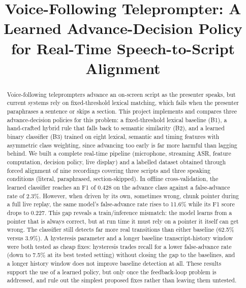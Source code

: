 \documentclass[conference,a4paper]{IEEEtran}
\begin{document}
\title{Voice-Following Teleprompter: A Learned Advance-Decision Policy for Real-Time Speech-to-Script Alignment}

\author{
}

\maketitle

\begin{abstract}
Voice-following teleprompters advance an on-screen script as the presenter speaks, but current systems rely on fixed-threshold lexical matching, which fails when the presenter paraphrases a sentence or skips a section. This project implements and compares three advance-decision policies for this problem: a fixed-threshold lexical baseline (B1), a hand-crafted hybrid rule that falls back to semantic similarity (B2), and a learned binary classifier (B3) trained on eight lexical, semantic and timing features with asymmetric class weighting, since advancing too early is far more harmful than lagging behind. We built a complete real-time pipeline (microphone, streaming ASR, feature computation, decision policy, live display) and a labelled dataset obtained through forced alignment of nine recordings covering three scripts and three speaking conditions (literal, paraphrased, section-skipped). In offline cross-validation, the learned classifier reaches an F1 of 0.428 on the advance class against a false-advance rate of 2.3\%. However, when driven by its own, sometimes wrong, chunk pointer during a full live replay, the same model's false-advance rate rises to 11.6\% while its F1 score drops to 0.227. This gap reveals a train/inference mismatch: the model learns from a pointer that is always correct, but at run time it must rely on a pointer it itself can get wrong. The classifier still detects far more real transitions than either baseline (62.5\% versus 3.9\%). A hysteresis parameter and a longer baseline transcript-history window were both tested as cheap fixes: hysteresis trades recall for a lower false-advance rate (down to 7.5\% at its best tested setting) without closing the gap to the baselines, and a longer history window does not improve baseline detection at all. These results support the use of a learned policy, but only once the feedback-loop problem is addressed, and rule out the simplest proposed fixes rather than leaving them untested.
\end{abstract}
\end{document}
